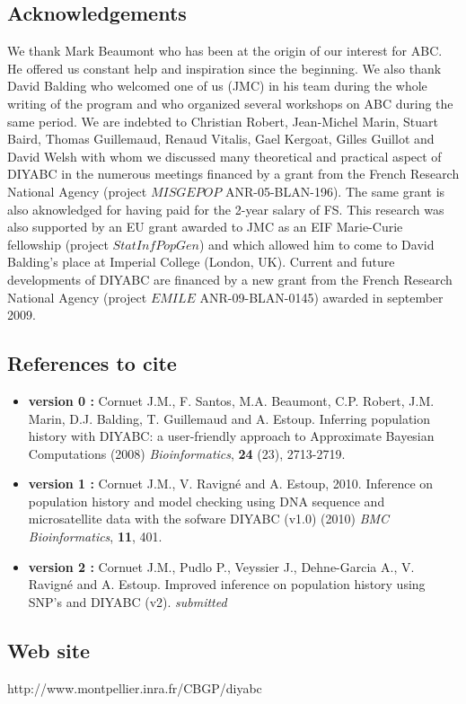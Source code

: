 \documentclass [a4paper]{report}
\let\subsectionv\subsection
\renewcommand{\subsection}[1]{\subsectionv{#1} \setcounter{paragraph}{0}}
\begin{document}
\subsection{Acknowledgements}
We thank Mark Beaumont who has been at the origin of our interest for ABC. He offered us constant help and inspiration since the beginning. We also thank David Balding who welcomed one of us (JMC) in his team during the whole writing of the program and who organized several workshops on ABC during the same period. We are indebted to Christian Robert, Jean-Michel Marin, Stuart Baird, Thomas Guillemaud, Renaud Vitalis, Gael Kergoat, Gilles Guillot and David Welsh with whom we discussed many theoretical and practical aspect of DIYABC in the numerous meetings financed by a grant from the French Research National Agency (project $MISGEPOP$ ANR-05-BLAN-196). The same grant is also aknowledged for having paid for the 2-year salary of FS. This research was also supported by an EU grant awarded to JMC as an EIF Marie-Curie fellowship (project $StatInfPopGen$) and which allowed him to come to David Balding's place at Imperial College (London, UK). Current and future developments of DIYABC are financed by a new grant from the French Research National Agency (project $EMILE$ ANR-09-BLAN-0145) awarded in september 2009.
\subsection{References to cite}
\begin{itemize}
\item \textbf{version 0 :} Cornuet J.M., F. Santos, M.A. Beaumont, C.P. Robert, J.M. Marin, D.J. Balding, T. Guillemaud and A. Estoup. Inferring population history with DIYABC: a user-friendly approach to Approximate Bayesian Computations (2008) \emph{Bioinformatics}, \textbf{24} (23), 2713-2719.
\item  \textbf{version 1 :}  Cornuet J.M., V. Ravign\'e and A. Estoup, 2010. Inference on population history and model checking using DNA sequence and microsatellite data with the sofware DIYABC (v1.0) (2010) \emph{BMC Bioinformatics}, \textbf{11}, 401.
\item  \textbf{version 2 :}  Cornuet J.M., Pudlo P., Veyssier J., Dehne-Garcia A., V. Ravign\'e and A. Estoup. Improved inference on population history using SNP's and DIYABC (v2). \emph{submitted}
\end{itemize}
\subsection{Web site}
http://www.montpellier.inra.fr/CBGP/diyabc\\



\newpage


%


\end{document}
